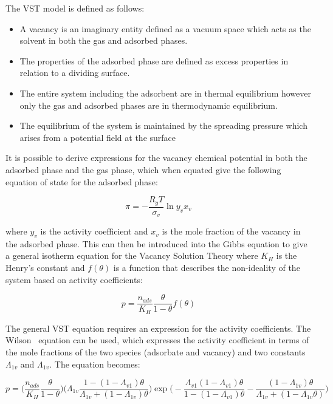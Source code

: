 The VST model is defined as follows:

\begin{itemize}

	\item A vacancy is an imaginary entity defined as a vacuum
	      space
	      which acts as the solvent in both the gas and adsorbed
	      phases.
	\item The properties of the adsorbed phase are defined as
	      excess properties
	      in relation to a dividing surface.
	\item The entire system including the adsorbent are in
	      thermal equilibrium
	      however only the gas and adsorbed phases are in
	      thermodynamic equilibrium.
	\item The equilibrium of the system is maintained by the
	      spreading pressure
	      which arises from a potential field at the surface

\end{itemize}

It is possible to derive expressions for the vacancy chemical
potential in both
the adsorbed phase and the gas phase, which when equated give the
following equation
of state for the adsorbed phase:

\begin{equation}
	\pi = - \frac{R_g T}{\sigma_v} \ln{y_v x_v}
\end{equation}

where \(y_v\) is the activity coefficient and  \(x_v\) is the mole
fraction of
the vacancy in the adsorbed phase.
This can then be introduced into the Gibbs equation to give a general
isotherm equation
for the Vacancy Solution Theory where \(K_H\) is the Henry’s constant
and
\(f(\theta)\) is a function that describes the non-ideality of the
system based
on activity coefficients:

\begin{equation}
	p = \frac{n_{ads}}{K_H} \frac{\theta}{1-\theta} f(\theta)
\end{equation}

The general VST equation requires an expression for the activity
coefficients.
The Wilson~\cite{suwanayuenGasAdsorptionIsotherm1980} equation can be
used,
which expresses the activity coefficient in terms
of the mole fractions of the two species (adsorbate and vacancy) and
two constants
\(\Lambda_{1v}\) and \(\Lambda_{1v}\). The equation becomes:

\begin{equation}\label{pyg:eqn:wvst}
	p = \bigg( \frac{n_{ads}}{K_H} \frac{\theta}{1-\theta} \bigg)
	\bigg( \Lambda_{1v}
	\frac{1-(1-\Lambda_{v1})\theta}{\Lambda_{1v}+(1-\Lambda_{1v})\theta}
	\bigg)
	\exp{\bigg(
		-\frac{\Lambda_{v1}(1-\Lambda_{v1})\theta}{1-(1-\Lambda_{v1})\theta}
		-\frac{(1 - \Lambda_{1v})\theta}{\Lambda_{1v} +
			(1-\Lambda_{1v}\theta)} \bigg)}
\end{equation}

